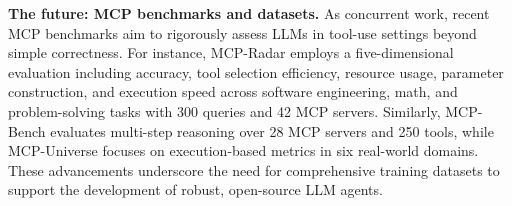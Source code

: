 \textbf{The future: MCP benchmarks and datasets.} As concurrent work, recent MCP benchmarks \citep{gao2025mcpradarmultidimensionalbenchmarkevaluating,wang2025mcpbenchbenchmarkingtoolusingllm,mcpuniverse,mcpmark_2025,guo2025mcpagentbenchevaluatingrealworldlanguage,yin2025livemcp,liu2025mcpevalautomaticmcpbaseddeep,yan2025mcpworldunifiedbenchmarkingtestbed,scale2025mcp} aim to rigorously assess LLMs in tool-use settings beyond simple correctness. For instance, MCP-Radar \citep{gao2025mcpradarmultidimensionalbenchmarkevaluating} employs a five-dimensional evaluation including accuracy, tool selection efficiency, resource usage, parameter construction, and execution speed across software engineering, math, and problem-solving tasks with 300 queries and 42 MCP servers. Similarly, MCP-Bench \citep{wang2025mcpbenchbenchmarkingtoolusingllm} evaluates multi-step reasoning over 28 MCP servers and 250 tools, while MCP-Universe \citep{mcpuniverse} focuses on execution-based metrics in six real-world domains. These advancements underscore the need for comprehensive training datasets to support the development of robust, open-source LLM agents.



